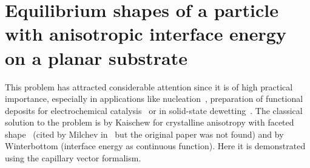 \section{Equilibrium shapes of a particle with anisotropic interface energy on a planar substrate}
This problem has attracted considerable attention since it is of high practical importance, especially in applications like nucleation~\cite{Bormashenko2021}, preparation of functional deposits for electrochemical catalysis~\cite{Tian2007} or in solid-state dewetting~\cite{PierreLuis2016, Bao2017}. The classical solution to the problem is by Kaischew for crystalline anisotropy with faceted shape~\cite{Kaischew1951} (cited by Milchev in~\cite{Milchev2002} but the original paper was not found) and by Winterbottom \cite{Winterbottom1967} (interface energy as continuous function). Here it is demonstrated using the capillary vector formalism. 

